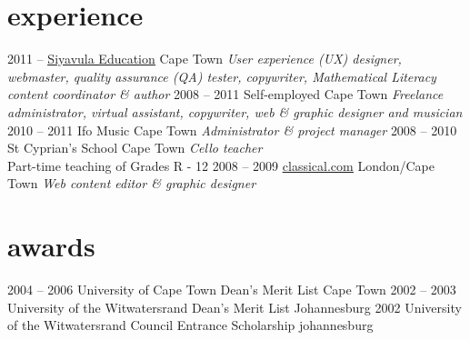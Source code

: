 \documentclass[]{friggeri-cv} %
\begin{document}

\section{experience}

\begin{entrylist}
\entry
{2011 --}
{\href{http://www.siyavula.com}{\underline{Siyavula Education}}}
{Cape Town}
{\emph{User experience (UX) designer, webmaster, quality assurance (QA) tester, copywriter, Mathematical Literacy content coordinator \& author}}
\entry
{2008 -- 2011}
{Self-employed}
{Cape Town}
{\emph{Freelance administrator, virtual assistant, copywriter, web \& graphic designer and musician}}
\entry
{2010 -- 2011}
{Ifo Music}
{Cape Town}
{\emph{Administrator \& project manager}}
\entry
{2008 -- 2010}
{St Cyprian's School}
{Cape Town}
{\emph{Cello teacher} \\
Part-time teaching of Grades R - 12}
\entry
{2008 -- 2009}
{\href{http://www.classical.com}{\underline{classical.com}}}
{London/Cape Town}
{\emph{Web content editor \& graphic designer}}

\end{entrylist}


\section{awards}

\begin{entrylist}
\entry
{2004 -- 2006}
{University of Cape Town Dean's Merit List}
{Cape Town}
{}
\entry
{2002 -- 2003}
{University of the Witwatersrand Dean's Merit List}
{Johannesburg}
{}
\entry
{2002}
{University of the Witwatersrand Council Entrance Scholarship}
{johannesburg}
{}
\end{entrylist}
\pagebreak
\end{document}
